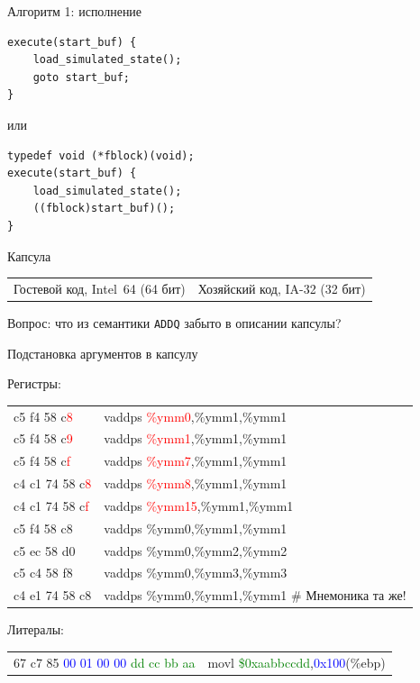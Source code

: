 \documentclass{beamer}
\begin{document}
\begin{frame}[fragile]{Алгоритм 1: исполнение}

\begin{verbatim}
execute(start_buf) {
    load_simulated_state();
    goto start_buf;
}
\end{verbatim}
\pause
или
\begin{verbatim}
typedef void (*fblock)(void);
execute(start_buf) {
    load_simulated_state();
    ((fblock)start_buf)();
}
\end{verbatim}

\end{frame}

\begin{frame}{Капсула}

\begin{small}
\begin{tabular}{p{}p{}}
Гостевой код, Intel~64 (64 бит) & Хозяйский код, IA-32 (32 бит)
\end{tabular}
\end{small}

\vfill

\centering
\pause

Вопрос: что из семантики \texttt{ADDQ} забыто в описании капсулы?
\end{frame}

\begin{frame}{Подстановка аргументов в капсулу}

{\ttfamily\small
{\sffamily Регистры:}

\begin{tabular}{ll}  
c5 f4 58 c\textcolor{red}{8}  &    vaddps \textcolor{red}{\%ymm0},\%ymm1,\%ymm1 \\
c5 f4 58 c\textcolor{red}{9}  &    vaddps \textcolor{red}{\%ymm1},\%ymm1,\%ymm1 \\
c5 f4 58 c\textcolor{red}{f}  &    vaddps \textcolor{red}{\%ymm7},\%ymm1,\%ymm1 \\\pause
c4 c1 74 58 c\textcolor{red}{8} &  vaddps \textcolor{red}{\%ymm8},\%ymm1,\%ymm1 \\
c4 c1 74 58 c\textcolor{red}{f} &  vaddps \textcolor{red}{\%ymm15},\%ymm1,\%ymm1 \\
c5 f4 58 c8  &    vaddps \%ymm0,\%ymm1,\%ymm1 \\
c5 ec 58 d0  &    vaddps \%ymm0,\%ymm2,\%ymm2 \\
c5 c4 58 f8  &    vaddps \%ymm0,\%ymm3,\%ymm3 \\\pause
c4 e1 74 58 c8 &  vaddps \%ymm0,\%ymm1,\%ymm1 \# Мнемоника та же!\\
\end{tabular}

\pause
{\sffamily Литералы:}
\begin{tabular}{ll}
67 c7 85 \textcolor{blue}{00 01 00 00} \textcolor{green}{dd cc bb aa}   & movl \textcolor{green}{\$0xaabbccdd},\textcolor{blue}{0x100}(\%ebp)
\end{tabular}
} %

\end{frame}
\end{document}
